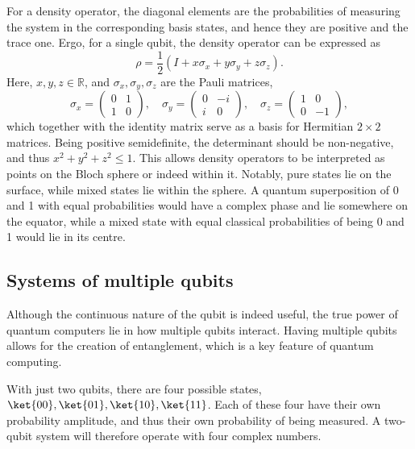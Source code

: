 For a density operator, the diagonal elements are the probabilities of measuring the system in the corresponding basis states, and hence they are positive and the trace one.
Ergo, for a single qubit, the density operator can be expressed as
\begin{equation}
    \rho = \frac{1}{2} \left(I + x \sigma_x + y \sigma_y + z \sigma_z\right).
\end{equation}
Here, $x, y, z \in \mathbb{R}$, and $\sigma_x, \sigma_y, \sigma_z$ are the Pauli matrices,
\begin{equation}
    \sigma_x = \begin{pmatrix} 0 & 1 \\ 1 & 0 \end{pmatrix}, \quad
    \sigma_y = \begin{pmatrix} 0 & -i \\ i & 0 \end{pmatrix}, \quad
    \sigma_z = \begin{pmatrix} 1 & 0 \\ 0 & -1 \end{pmatrix},
    \label{eq:pauli}
\end{equation}
which together with the identity matrix serve as a basis for Hermitian $2\times 2$ matrices.
Being positive semidefinite, the determinant should be non-negative, and thus $x^2 + y^2 + z^2 \leq 1$.
This allows density operators to be interpreted as points on the Bloch sphere or indeed within it.
Notably, pure states lie on the surface, while mixed states lie within the sphere.
A quantum superposition of 0 and 1 with equal probabilities would have a complex phase and lie somewhere on the equator, while a mixed state with equal classical probabilities of being 0 and 1 would lie in its centre.

\subsection{Systems of multiple qubits}
Although the continuous nature of the qubit is indeed useful, the true power of quantum computers lie in how multiple qubits interact.
Having multiple qubits allows for the creation of entanglement, which is a key feature of quantum computing.

With just two qubits, there are four possible states, $\ket{00}, \ket{01}, \ket{10}, \ket{11}$.
Each of these four have their own probability amplitude, and thus their own probability of being measured.
A two-qubit system will therefore operate with four complex numbers.

